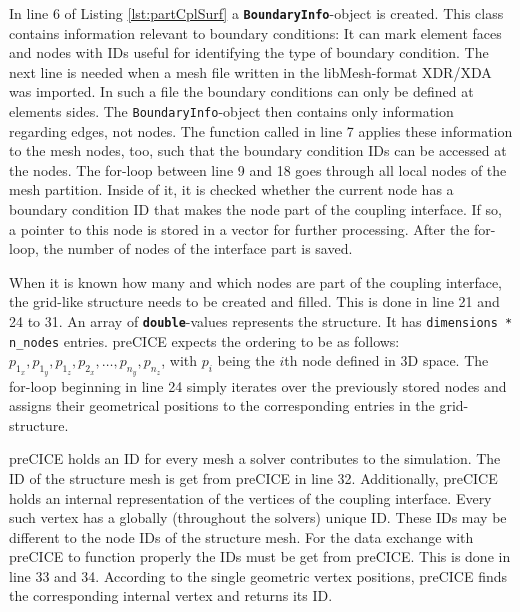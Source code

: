    In line 6 of Listing \ref{lst:partCplSurf} a \texttt{\textbf{BoundaryInfo}}-object is created. This class contains information relevant to boundary conditions: It can mark element faces and nodes with IDs useful for identifying the type of boundary condition. The next line is needed when a mesh file written in the libMesh-format XDR/XDA was imported. In such a file the boundary conditions can only be defined at elements sides. The \texttt{BoundaryInfo}-object then contains only information regarding edges, not nodes. The function called in line 7 applies these information to the mesh nodes, too, such that the boundary condition IDs can be accessed at the nodes. The for-loop between line 9 and 18 goes through all local nodes of the mesh partition. Inside of it, it is checked whether the current node has a boundary condition ID that makes the node part of the coupling interface. If so, a pointer to this node is stored in a vector for further processing. After the for-loop, the number of nodes of the interface part is saved.
   
   When it is known how many and which nodes are part of the coupling interface, the grid-like structure needs to be created and filled. This is done in line 21 and 24 to 31. An array of \texttt{\textbf{double}}-values represents the structure. It has \texttt{dimensions * n\_nodes} entries. preCICE expects the ordering to be as follows: $p_{1_x}, p_{1_y}, p_{1_z}, p_{2_x}, \ldots, p_{n_y}, p_{n_z}$, with $p_i$ being the $i$th node defined in 3D space. The for-loop beginning in line 24 simply iterates over the previously stored nodes and assigns their geometrical positions to the corresponding entries in the grid-structure.
   
   preCICE holds an ID for every mesh a solver contributes to the simulation. The ID of the structure mesh is get from preCICE in line 32. Additionally, preCICE holds an internal representation of the vertices of the coupling interface. Every such vertex has a globally (throughout the solvers) unique ID. These IDs may be different to the node IDs of the structure mesh. For the data exchange with preCICE to function properly the IDs must be get from preCICE. This is done in line 33 and 34. According to the single geometric vertex positions, preCICE finds the corresponding internal vertex and returns its ID.

